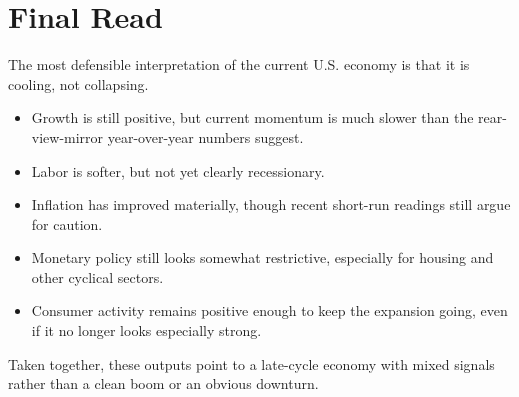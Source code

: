 \documentclass[11pt]{article}
\begin{document}
\section*{Final Read}

The most defensible interpretation of the current U.S. economy is that it is cooling, not collapsing.

\begin{itemize}
  \item Growth is still positive, but current momentum is much slower than the rear-view-mirror year-over-year numbers suggest.
  \item Labor is softer, but not yet clearly recessionary.
  \item Inflation has improved materially, though recent short-run readings still argue for caution.
  \item Monetary policy still looks somewhat restrictive, especially for housing and other cyclical sectors.
  \item Consumer activity remains positive enough to keep the expansion going, even if it no longer looks especially strong.
\end{itemize}

Taken together, these outputs point to a late-cycle economy with mixed signals rather than a clean boom or an obvious downturn.
\end{document}
